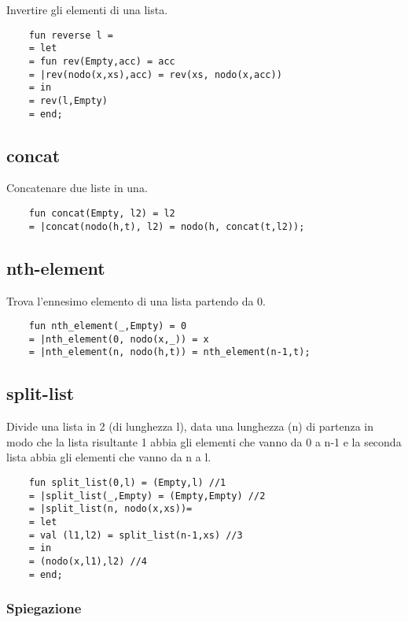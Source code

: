 Invertire gli elementi di una lista.

\begin{lstlisting}
    fun reverse l =
    = let
    = fun rev(Empty,acc) = acc
    = |rev(nodo(x,xs),acc) = rev(xs, nodo(x,acc))
    = in
    = rev(l,Empty)
    = end;
\end{lstlisting}

\subsection{concat}

Concatenare due liste in una.

\begin{lstlisting}
    fun concat(Empty, l2) = l2 
    = |concat(nodo(h,t), l2) = nodo(h, concat(t,l2));
\end{lstlisting}

\subsection{nth-element}

Trova l'ennesimo elemento di una lista partendo da 0.

\begin{lstlisting}
    fun nth_element(_,Empty) = 0
    = |nth_element(0, nodo(x,_)) = x
    = |nth_element(n, nodo(h,t)) = nth_element(n-1,t);
\end{lstlisting}

\subsection{split-list}

Divide una lista in 2 (di lunghezza l), data una lunghezza (n) di partenza in modo che la lista risultante 1 abbia gli elementi che vanno da 0 a n-1 e la seconda lista abbia gli elementi che vanno da n a l.

\begin{lstlisting}
    fun split_list(0,l) = (Empty,l) //1
    = |split_list(_,Empty) = (Empty,Empty) //2
    = |split_list(n, nodo(x,xs))= 
    = let
    = val (l1,l2) = split_list(n-1,xs) //3
    = in
    = (nodo(x,l1),l2) //4
    = end;
\end{lstlisting}

\subsubsection{Spiegazione}

